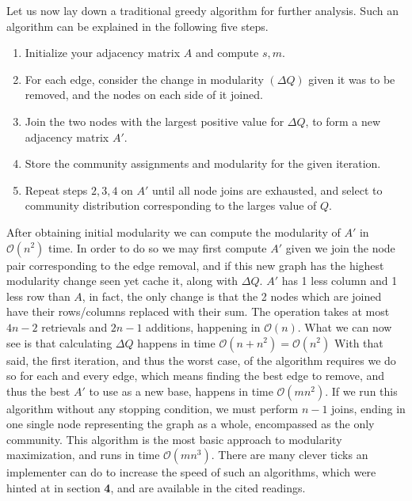 \documentclass[a4paper, 10pt, twocolumn]{article}
\begin{document}
Let us now lay down a traditional greedy algorithm for further analysis. 
Such an algorithm can be explained in the following five steps. 

\begin{enumerate}
       \item Initialize your adjacency matrix $ A $ and compute $ s, m $.
       \item For each edge, consider the change in modularity $ (\Delta Q) $ given it was to be removed, and the nodes on each side of it joined. 
       \item Join the two nodes with the largest positive value for $ \Delta Q $, to form a new adjacency matrix $ A' $.
       \item Store the community assignments and modularity for the given iteration.
       \item Repeat steps $ 2,3,4 $ on $ A' $ until all node joins are exhausted, and select to community distribution corresponding to the larges value of $ Q $.
\end{enumerate}

\noindent
After obtaining initial modularity we can compute the modularity of $ A' $ in $ \mathcal{O}(n^{2}) $ time. In order to do so we may first compute $ A' $ given we join the node pair corresponding to the edge removal, and if this new graph has the highest modularity change seen yet cache it, along with $ \Delta Q $. 
$ A' $ has 1 less column and 1 less row than $ A $, in fact, the only change is that the 2 nodes which are joined have their rows/columns replaced with their sum. 
The operation takes at most $ 4n -2 $ retrievals and $ 2n - 1 $ additions, happening in $ \mathcal{O}(n) $. 
What we can now see is that calculating $ \Delta Q $ happens in time $ \mathcal{O}(n + n^{2}) = \mathcal{O}(n^{2})$
With that said, the first iteration, and thus the worst case, of the algorithm requires we do so for each and every edge, which means finding the best edge to remove, and thus the best $ A' $ to use as a new base, happens in time $ \mathcal{O}(mn^{2}) $.
If we run this algorithm without any stopping condition, we must perform $ n - 1 $ joins, ending in one single node representing the graph as a whole, encompassed as the only community. 
This algorithm is the most basic approach to modularity maximization, and runs in time $ \mathcal{O}(mn^{3}) $.
There are many clever ticks an implementer can do to increase the speed of such an algorithms, which were hinted at in section \textbf{4}, and are available in the cited readings. 
\end{document}
